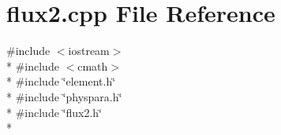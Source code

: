 \section{flux2.\-cpp File Reference}
\label{flux2_8cpp}
{\ttfamily \#include $<$iostream$>$}\\*
{\ttfamily \#include $<$cmath$>$}\\*
{\ttfamily \#include \char`\"{}element.\-h\char`\"{}}\\*
{\ttfamily \#include \char`\"{}physpara.\-h\char`\"{}}\\*
{\ttfamily \#include \char`\"{}flux2.\-h\char`\"{}}\\*
